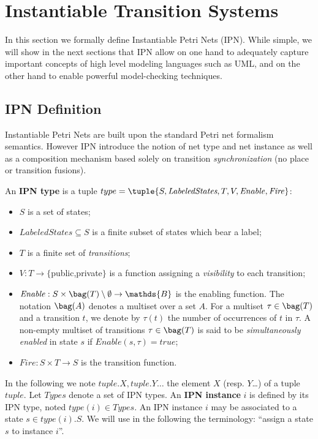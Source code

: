 \section{Instantiable Transition Systems} \label{its-def}

 In this section we formally define Instantiable Petri Nets (IPN).
While simple, we will show in the next sections that IPN allow on
one hand to adequately capture important concepts of high level
modeling languages such as UML, and on the other hand to enable
powerful model-checking techniques.

\subsection{IPN Definition}
\label{ss:ipndef}

Instantiable Petri Nets are built upon the standard Petri net
formalism semantics. However IPN introduce the notion of net type
 and net instance as well as a composition mechanism based solely on
transition \emph{synchronization} (no place or transition fusions).

An \textbf{IPN type} is a tuple
$type=\tuple{S,\textit{LabeledStates},T,V,\mathit{Enable},\mathit{Fire}}$:
\begin{itemize}
\item $S$ is a set of states;
\item $\textit{LabeledStates} \subseteq S$ is a finite subset of states which bear a label;
\item $T$ is a finite set of \emph{transitions};
\item $V: T \rightarrow \{$public,private$\}$ is a function assigning a \emph{visibility} to each transition;
\item $\mathit{Enable} : S \times \bag(T) \setminus \emptyset \rightarrow \mathds{B}$ is the enabling function. The notation $\bag(A)$ denotes a multiset over a set $A$. For a multiset $\tau \in \bag(T)$ and a transition $t$, we denote by $\tau(t)$ the number of occurrences of $t$ in $\tau$. A non-empty multiset of transitions $\tau \in \bag(T)$ is said to be \emph{simultaneously enabled} in state $s$ if $\mathit{Enable}(s,\tau) = \mathit{true}$;
\item $\mathit{Fire} : S \times T \rightarrow S$ is the transition function.
\end{itemize}

In the following we note $tuple.X, tuple.Y \ldots$ the element $X$
(resp. $Y$\ldots) of a tuple $tuple$. Let $\mathit{Types}$ denote a
set of IPN types. An \textbf{IPN instance} $i$ is defined by its IPN
type, noted $\mathit{type}(i) \in \mathit{Types}$.
 An IPN instance $i$ may be associated to a state $s \in
\mathit{type}(i).S$. We will use in the following the terminology:
``assign a state $s$ to instance $i$''.

